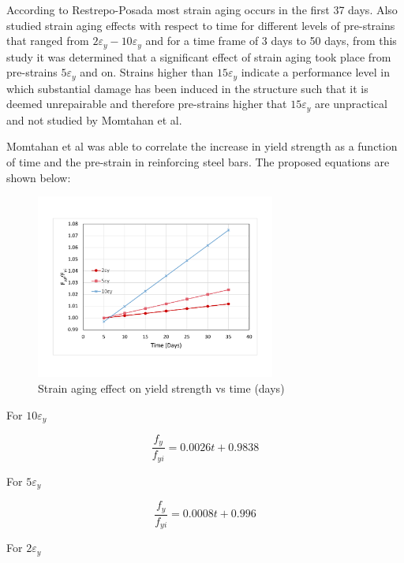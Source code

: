 According to Restrepo-Posada\cite{Restrepo-Posada1994} most strain aging occurs in the first 37 days. Also \cite{Momtahan2009} studied strain aging effects with respect to time for different levels of pre-strains that ranged from $2\varepsilon_y - 10\varepsilon_y$ and for a time frame of 3 days to 50 days, from this study it was determined that a significant effect of strain aging took place from pre-strains $5\varepsilon_y$ and on. Strains higher than $15\varepsilon_y$ indicate a performance level in which substantial damage has been induced in the structure such that it is deemed unrepairable and therefore pre-strains higher that $15\varepsilon_y$ are unpractical and not studied by Momtahan et al\cite{Momtahan2009}.

Momtahan et al was able to correlate the increase in yield strength as a function of time and the pre-strain in reinforcing steel bars. The proposed equations are shown below:

\begin{figure}[htbp]
\centering
\includegraphics[width=0.7\textwidth]{Chapter-2/figs/StrainAging_TimeDependent}
\caption{Strain aging effect on yield strength vs time (days)}
\label{fig:hist4}
\end{figure}

For $10\varepsilon_y$

\begin{equation}
  \frac{f_y}{f_{yi}}=0.0026t+0.9838
  \label{eq.twelve}
\end{equation} 

For $5\varepsilon_y$

\begin{equation}
  \frac{f_y}{f_{yi}}=0.0008t+0.996
  \label{eq.thirteen}
\end{equation} 

For $2\varepsilon_y$

